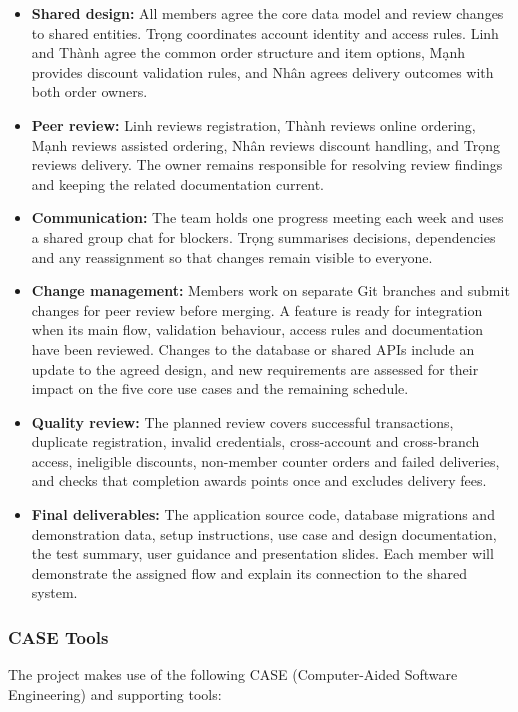 \begin{itemize}
  \item \textbf{Shared design:} All members agree the core data model and review changes to shared entities. Trọng coordinates account identity and access rules. Linh and Thành agree the common order structure and item options, Mạnh provides discount validation rules, and Nhân agrees delivery outcomes with both order owners.
  \item \textbf{Peer review:} Linh reviews registration, Thành reviews online ordering, Mạnh reviews assisted ordering, Nhân reviews discount handling, and Trọng reviews delivery. The owner remains responsible for resolving review findings and keeping the related documentation current.
  \item \textbf{Communication:} The team holds one progress meeting each week and uses a shared group chat for blockers. Trọng summarises decisions, dependencies and any reassignment so that changes remain visible to everyone.
  \item \textbf{Change management:} Members work on separate Git branches and submit changes for peer review before merging. A feature is ready for integration when its main flow, validation behaviour, access rules and documentation have been reviewed. Changes to the database or shared APIs include an update to the agreed design, and new requirements are assessed for their impact on the five core use cases and the remaining schedule.
  \item \textbf{Quality review:} The planned review covers successful transactions, duplicate registration, invalid credentials, cross-account and cross-branch access, ineligible discounts, non-member counter orders and failed deliveries, and checks that completion awards points once and excludes delivery fees.
  \item \textbf{Final deliverables:} The application source code, database migrations and demonstration data, setup instructions, use case and design documentation, the test summary, user guidance and presentation slides. Each member will demonstrate the assigned flow and explain its connection to the shared system.
\end{itemize}

\subsubsection{CASE Tools}

The project makes use of the following CASE (Computer-Aided Software Engineering) and supporting tools:

